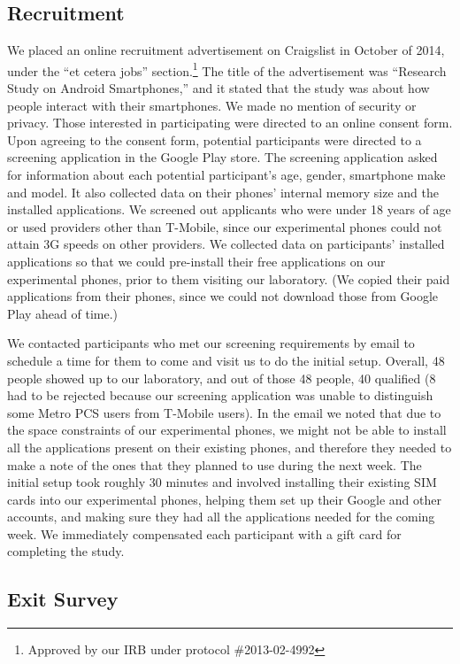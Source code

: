 \documentclass[letterpaper,twocolumn,10pt]{article}
\begin{document}
\subsection{Recruitment}

We placed an online recruitment advertisement on Craigslist in October of 2014, under the ``et cetera jobs'' 
section.\footnote{Approved by our IRB under protocol \#2013-02-4992} The title of the advertisement was ``Research Study on Android Smartphones,'' and it 
stated that the study was about how people interact with their smartphones. We made no mention of 
security or privacy. Those interested in participating were directed to an online consent form. Upon agreeing to the consent form, potential participants were directed to a screening application in the Google Play store. The screening application asked for information about each potential participant's age, 
gender, smartphone make and model. It also collected data on their phones' internal memory size and the installed applications. We screened out applicants who 
were under 18 years of age or used providers other than T-Mobile, since our experimental phones could not attain 3G speeds on other providers. We collected data on participants' installed applications so that we could pre-install their free applications on our experimental phones, prior to them visiting our laboratory. (We copied their paid applications from their phones, since we could not download those from Google Play ahead of time.)

We contacted participants who met our screening requirements by email to schedule a time for them to come and visit us to do the initial setup. Overall, 48 people showed up to our laboratory, and out of those 48 people, 40 qualified (8 had to be rejected because our screening application was unable to distinguish some Metro PCS users from T-Mobile users).  In the email we
noted that due to the space constraints of our experimental phones, we might not be able to install all the applications present on their existing phones, and therefore they needed to make a note of the ones that they planned to use during the next week. The initial setup took roughly 30 minutes and involved installing their existing SIM cards into our experimental phones, helping them set up their Google and other accounts, and making sure they had all the applications needed
for the coming week. We immediately compensated each participant with a  gift card for completing the study.

\subsection{Exit Survey}
\end{document}
